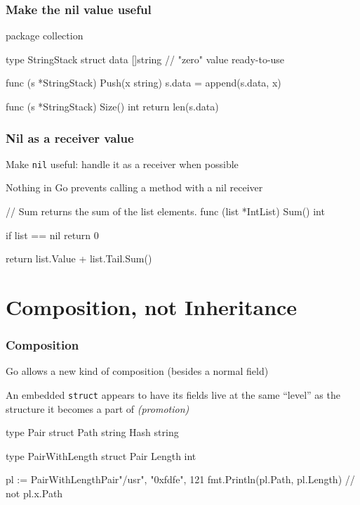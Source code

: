 \documentclass[handout,compress,t,11pt]{beamer}
\begin{document}
\begin{frame}[fragile]
    \frametitle{Make the nil value useful}
\begin{golang}
package collection


type StringStack struct {
    data []string     // "zero" value ready-to-use
}


func (s *StringStack) Push(x string) {
    s.data = append(s.data, x)
}

func (s *StringStack) Size() int {
    return len(s.data)
}
\end{golang}
\end{frame}

\begin{frame}[fragile]
    \frametitle{Nil as a receiver value}
    Make \verb|nil| useful: handle it as a receiver when possible \par
    \vspace{0.4\baselineskip}
    Nothing in Go prevents calling a method with a nil receiver
    \vspace{\baselineskip}
\begin{golang}
// Sum returns the sum of the list elements.
func (list *IntList) Sum() int {
    if list == nil {
        return 0
    }

    return list.Value + list.Tail.Sum()
}
\end{golang}
\end{frame}



\section{Composition, not Inheritance}
\begin{frame}[fragile]
    \frametitle{Composition}
    Go allows a new kind of composition (besides a normal field) \par
    \vspace{0.4\baselineskip}
    An embedded \verb|struct| appears to have its fields live at the
    same ``level'' as the structure it becomes a part of {\em (promotion)} \par
    \vspace{0.6\baselineskip}
\begin{golang}
type Pair struct {
    Path string
    Hash string
}

type PairWithLength struct {
    Pair
    Length int
}

pl := PairWithLength{Pair{"/usr", "0xfdfe"}, 121}
fmt.Println(pl.Path, pl.Length)  // not pl.x.Path
\end{golang}
\end{frame}
\end{document}
